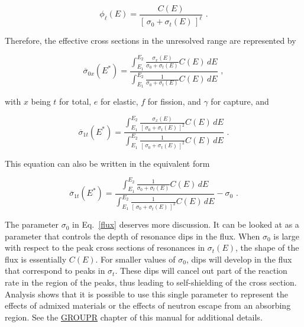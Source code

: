 \begin{equation}
   \phi_\ell(E)=\frac{C(E)}{[\,\sigma_0+\sigma_t(E)\,]^\ell}\,\,.
\label{flux}
\end{equation}

\noindent
Therefore, the effective cross sections in the unresolved range
are represented by

\begin{equation}
   \overline{\sigma}_{0x}(E^*)=\displaystyle\frac
     {\displaystyle\int_{E_1}^{E_2}
        \frac{\sigma_x(E)}{\sigma_0+\sigma_t(E)}C(E)\,dE}
     {\displaystyle\int_{E_1}^{E_2}
        \frac{1}{\sigma_0+\sigma_t(E)}C(E)\,dE}\,\,,
\end{equation}

\noindent
with $x$ being $t$ for total, $e$ for elastic, $f$ for fission,
and $\gamma$ for capture, and

\begin{equation}
   \overline{\sigma}_{1t}(E^*)=\displaystyle\frac
     {\displaystyle\int_{E_1}^{E_2}
        \frac{\sigma_x(E)}{[\,\sigma_0+\sigma_t(E)\,]^2}C(E)\,dE}
     {\displaystyle\int_{E_1}^{E_2}
        \frac{1}{[\,\sigma_0+\sigma_t(E)\,]^2}C(E)\,dE}\,\,.
\end{equation}

\noindent
This equation can also be written in the equivalent form

\begin{equation}
   \overline{\sigma}_{1t}(E^*)=\displaystyle\frac
     {\displaystyle\int_{E_1}^{E_2}
        \frac{1}{\sigma_0+\sigma_t(E)}C(E)\,dE}
     {\displaystyle\int_{E_1}^{E_2}
        \frac{1}{[\,\sigma_0+\sigma_t(E)\,]^2}C(E)\,dE}
     - \sigma_0\,\,.
\end{equation}

The parameter $\sigma_0$ in Eq.~\ref{flux} deserves
more discussion.  It can be looked at as a parameter that controls
the depth of resonance dips in the flux.  When $\sigma_0$ is
large with respect to the peak cross sections of resonances in
$\sigma_t(E)$, the shape of the flux is essentially $C(E)$.
For smaller values of $\sigma_0$, dips will develop in the
flux that correspond to peaks in $\sigma_t$.  These dips will
cancel out part of the reaction rate in the region of the
peaks, thus leading to self-shielding
of the cross section.  Analysis shows that it is possible to use
this single parameter to represent the effects of admixed materials
or the effects of neutron escape from an absorbing region.   See
the \hyperlink{sGROUPRhy}{GROUPR} chapter
of this manual for additional details.

